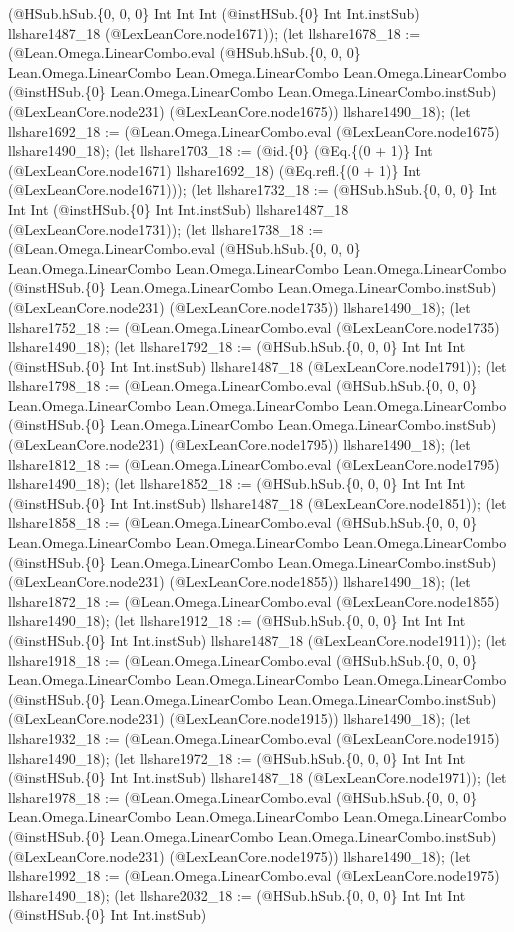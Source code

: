 \documentclass[11pt]{article}
\begin{document}
(@HSub.hSub.\{0, 0, 0\} Int Int Int (@instHSub.\{0\} Int Int.instSub) llshare1487\_18 (@LexLeanCore.node1671)); (let llshare1678\_18 := (@Lean.Omega.LinearCombo.eval (@HSub.hSub.\{0, 0, 0\} Lean.Omega.LinearCombo Lean.Omega.LinearCombo Lean.Omega.LinearCombo (@instHSub.\{0\} Lean.Omega.LinearCombo Lean.Omega.LinearCombo.instSub) (@LexLeanCore.node231) (@LexLeanCore.node1675)) llshare1490\_18); (let llshare1692\_18 := (@Lean.Omega.LinearCombo.eval (@LexLeanCore.node1675) llshare1490\_18); (let llshare1703\_18 := (@id.\{0\} (@Eq.\{(0 + 1)\} Int (@LexLeanCore.node1671) llshare1692\_18) (@Eq.refl.\{(0 + 1)\} Int (@LexLeanCore.node1671))); (let llshare1732\_18 := (@HSub.hSub.\{0, 0, 0\} Int Int Int (@instHSub.\{0\} Int Int.instSub) llshare1487\_18 (@LexLeanCore.node1731)); (let llshare1738\_18 := (@Lean.Omega.LinearCombo.eval (@HSub.hSub.\{0, 0, 0\} Lean.Omega.LinearCombo Lean.Omega.LinearCombo Lean.Omega.LinearCombo (@instHSub.\{0\} Lean.Omega.LinearCombo Lean.Omega.LinearCombo.instSub) (@LexLeanCore.node231) (@LexLeanCore.node1735)) llshare1490\_18); (let llshare1752\_18 := (@Lean.Omega.LinearCombo.eval (@LexLeanCore.node1735) llshare1490\_18); (let llshare1792\_18 := (@HSub.hSub.\{0, 0, 0\} Int Int Int (@instHSub.\{0\} Int Int.instSub) llshare1487\_18 (@LexLeanCore.node1791)); (let llshare1798\_18 := (@Lean.Omega.LinearCombo.eval (@HSub.hSub.\{0, 0, 0\} Lean.Omega.LinearCombo Lean.Omega.LinearCombo Lean.Omega.LinearCombo (@instHSub.\{0\} Lean.Omega.LinearCombo Lean.Omega.LinearCombo.instSub) (@LexLeanCore.node231) (@LexLeanCore.node1795)) llshare1490\_18); (let llshare1812\_18 := (@Lean.Omega.LinearCombo.eval (@LexLeanCore.node1795) llshare1490\_18); (let llshare1852\_18 := (@HSub.hSub.\{0, 0, 0\} Int Int Int (@instHSub.\{0\} Int Int.instSub) llshare1487\_18 (@LexLeanCore.node1851)); (let llshare1858\_18 := (@Lean.Omega.LinearCombo.eval (@HSub.hSub.\{0, 0, 0\} Lean.Omega.LinearCombo Lean.Omega.LinearCombo Lean.Omega.LinearCombo (@instHSub.\{0\} Lean.Omega.LinearCombo Lean.Omega.LinearCombo.instSub) (@LexLeanCore.node231) (@LexLeanCore.node1855)) llshare1490\_18); (let llshare1872\_18 := (@Lean.Omega.LinearCombo.eval (@LexLeanCore.node1855) llshare1490\_18); (let llshare1912\_18 := (@HSub.hSub.\{0, 0, 0\} Int Int Int (@instHSub.\{0\} Int Int.instSub) llshare1487\_18 (@LexLeanCore.node1911)); (let llshare1918\_18 := (@Lean.Omega.LinearCombo.eval (@HSub.hSub.\{0, 0, 0\} Lean.Omega.LinearCombo Lean.Omega.LinearCombo Lean.Omega.LinearCombo (@instHSub.\{0\} Lean.Omega.LinearCombo Lean.Omega.LinearCombo.instSub) (@LexLeanCore.node231) (@LexLeanCore.node1915)) llshare1490\_18); (let llshare1932\_18 := (@Lean.Omega.LinearCombo.eval (@LexLeanCore.node1915) llshare1490\_18); (let llshare1972\_18 := (@HSub.hSub.\{0, 0, 0\} Int Int Int (@instHSub.\{0\} Int Int.instSub) llshare1487\_18 (@LexLeanCore.node1971)); (let llshare1978\_18 := (@Lean.Omega.LinearCombo.eval (@HSub.hSub.\{0, 0, 0\} Lean.Omega.LinearCombo Lean.Omega.LinearCombo Lean.Omega.LinearCombo (@instHSub.\{0\} Lean.Omega.LinearCombo Lean.Omega.LinearCombo.instSub) (@LexLeanCore.node231) (@LexLeanCore.node1975)) llshare1490\_18); (let llshare1992\_18 := (@Lean.Omega.LinearCombo.eval (@LexLeanCore.node1975) llshare1490\_18); (let llshare2032\_18 := (@HSub.hSub.\{0, 0, 0\} Int Int Int (@instHSub.\{0\} Int Int.instSub) 
\end{document}
